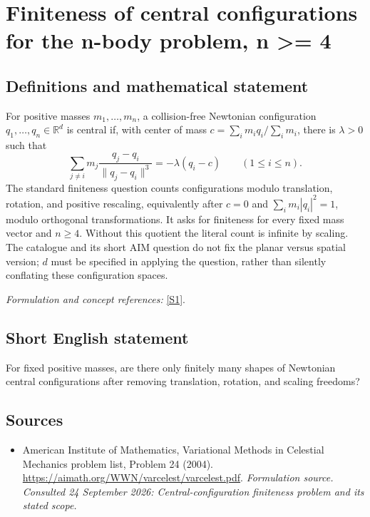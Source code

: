 \documentclass[11pt]{article}
\begin{document}
\section*{\texorpdfstring{Finiteness of central configurations for the n-body problem, n >= 4}{Finiteness of central configurations for the n-body problem, n >= 4}}\label{410}
\subsection{Definitions and mathematical statement}
For positive masses $m_1,\ldots,m_n$, a collision-free Newtonian configuration $q_1,\ldots,q_n\in{\mathbb{R}}^d$ is central if, with center of mass $c=\sum_i m_iq_i/\sum_i m_i$, there is $\lambda>0$ such that
\[
 \sum_{j\ne i}m_j\frac{q_j-q_i}{\|q_j-q_i\|^3}
 =-\lambda(q_i-c)\qquad(1\le i\le n).
\]
The standard finiteness question counts configurations modulo translation, rotation, and positive rescaling, equivalently after $c=0$ and $\sum_i m_i|q_i|^2=1$, modulo orthogonal transformations. It asks for finiteness for every fixed mass vector and $n\ge4$. Without this quotient the literal count is infinite by scaling. The catalogue and its short AIM question do not fix the planar versus spatial version; $d$ must be specified in applying the question, rather than silently conflating these configuration spaces.
\par\smallskip\textit{Formulation and concept references:} \href{https://aimath.org/WWN/varcelest/varcelest.pdf}{[S1]}.

\subsection{Short English statement}
For fixed positive masses, are there only finitely many shapes of Newtonian central configurations after removing translation, rotation, and scaling freedoms?
\subsection{Sources}
\begin{itemize}
\item[S1]American Institute of Mathematics, Variational Methods in Celestial Mechanics problem list, Problem 24 (2004).
\url{https://aimath.org/WWN/varcelest/varcelest.pdf}.
\textit{Formulation source. Consulted 24 September 2026: Central-configuration finiteness problem and its stated scope.}
\end{itemize}
\end{document}
